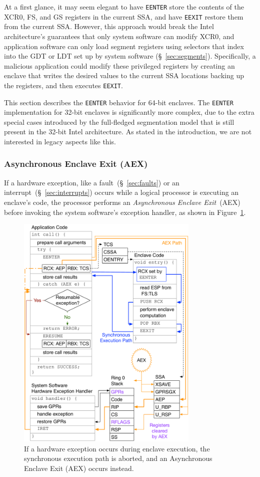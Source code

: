 At a first glance, it may seem elegant to have \texttt{EENTER} store the
contents of the XCR0, FS, and GS registers in the current SSA, and have
\texttt{EEXIT} restore them from the current SSA. However, this approach would
break the Intel architecture's guarantees that only system software can modify
XCR0, and application software can only load segment registers using selectors
that index
into the GDT or LDT set up by system software (\S~\ref{sec:segments}).
Specifically, a malicious application could modify these privileged registers
by creating an enclave that writes the desired values to the current SSA
locations backing up the registers, and then executes \texttt{EEXIT}.

This section describes the \texttt{EENTER} behavior for 64-bit enclaves. The
\texttt{EENTER} implementation for 32-bit enclaves is significantly more
complex, due to the extra special cases introduced by the full-fledged
segmentation model that is still present in the 32-bit Intel architecture. As
stated in the introduction, we are not interested in legacy aspects like this.


\subsubsection{Asynchronous Enclave Exit (AEX)}
\label{sec:sgx_aex}

If a hardware exception, like a fault~(\S~\ref{sec:faults}) or an
interrupt~(\S~\ref{sec:interrupts}) occurs while a logical processor is
executing an enclave's code, the processor performs an
\textit{Asynchronous Enclave Exit}~(AEX) before invoking the system software's
exception handler, as shown in Figure~\ref{fig:sgx_aex_setup}.

\begin{figure}[hbt]
  \centering
  \includegraphics[width=87mm]{figures/sgx_aex_setup.pdf}
  \caption{
    If a hardware exception occurs during enclave execution, the synchronous
    execution path is aborted, and an Asynchronous Enclave Exit (AEX) occurs
    instead.
  }
  \label{fig:sgx_aex_setup}
\end{figure}

